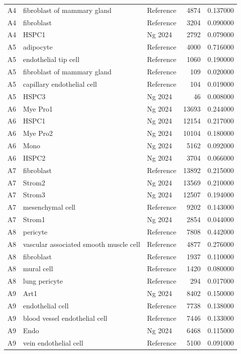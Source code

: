 \begin{longtable}{lllrr}
A4 & fibroblast of mammary gland & Reference & 4874 & 0.137000 \\
A4 & fibroblast & Reference & 3204 & 0.090000 \\
A4 & HSPC1 & Ng 2024 & 2792 & 0.079000 \\
A5 & adipocyte & Reference & 4000 & 0.716000 \\
A5 & endothelial tip cell & Reference & 1060 & 0.190000 \\
A5 & fibroblast of mammary gland & Reference & 109 & 0.020000 \\
A5 & capillary endothelial cell & Reference & 104 & 0.019000 \\
A5 & HSPC3 & Ng 2024 & 46 & 0.008000 \\
A6 & Mye Pro1 & Ng 2024 & 13693 & 0.244000 \\
A6 & HSPC1 & Ng 2024 & 12154 & 0.217000 \\
A6 & Mye Pro2 & Ng 2024 & 10104 & 0.180000 \\
A6 & Mono & Ng 2024 & 5162 & 0.092000 \\
A6 & HSPC2 & Ng 2024 & 3704 & 0.066000 \\
A7 & fibroblast & Reference & 13892 & 0.215000 \\
A7 & Strom2 & Ng 2024 & 13569 & 0.210000 \\
A7 & Strom3 & Ng 2024 & 12507 & 0.194000 \\
A7 & mesenchymal cell & Reference & 9202 & 0.143000 \\
A7 & Strom1 & Ng 2024 & 2854 & 0.044000 \\
A8 & pericyte & Reference & 7808 & 0.442000 \\
A8 & vascular associated smooth muscle cell & Reference & 4877 & 0.276000 \\
A8 & fibroblast & Reference & 1937 & 0.110000 \\
A8 & mural cell & Reference & 1420 & 0.080000 \\
A8 & lung pericyte & Reference & 294 & 0.017000 \\
A9 & Art1 & Ng 2024 & 8402 & 0.150000 \\
A9 & endothelial cell & Reference & 7738 & 0.138000 \\
A9 & blood vessel endothelial cell & Reference & 7446 & 0.133000 \\
A9 & Endo & Ng 2024 & 6468 & 0.115000 \\
A9 & vein endothelial cell & Reference & 5100 & 0.091000 \\
\end{longtable}
